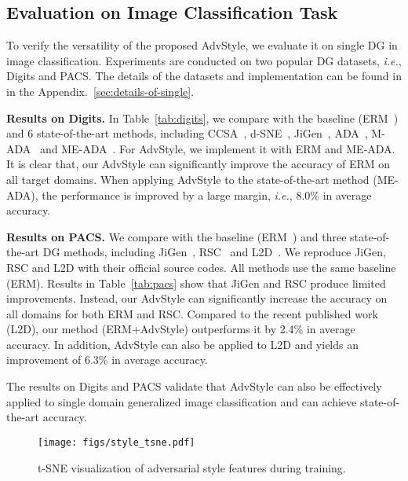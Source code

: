 \documentclass{article}
\def\ie{\emph{i.e.}} \def\Ie{\emph{I.e.}}
\newcommand{\ours}{AdvStyle\xspace}
\begin{document}
\subsection{Evaluation on Image Classification Task}


To verify the versatility of the proposed \ours, we evaluate it on single DG in image classification. Experiments are conducted on two popular DG datasets, \textit{i.e.}, Digits and PACS. The details of the datasets and implementation can be found in in the Appendix.~\ref{sec:details-of-single}.


\textbf{Results on Digits.} In Table~\ref{tab:digits}, we compare with the baseline (ERM~\cite{vapnik2013nature}) and 6 state-of-the-art methods, including CCSA~\cite{motiian2017unified}, d-SNE~\cite{xu2019d}, JiGen~\cite{carlucci2019domain}, ADA~\cite{volpi2018generalizing}, M-ADA~\cite{qiao2020learning} and ME-ADA~\cite{zhao2020maximum}. For \ours, we implement it with ERM and ME-ADA. It is clear that, our \ours can significantly improve the accuracy of ERM on all target domains. When applying \ours to the state-of-the-art method (ME-ADA), the performance is improved by a large margin, \ie, 8.0\% in average accuracy.


\textbf{Results on PACS.} We compare with the baseline (ERM~\cite{vapnik2013nature}) and three state-of-the-art DG methods, including JiGen~\cite{carlucci2019domain}, RSC~\cite{huangRSC2020} and L2D~\cite{wang2021L2D}. We reproduce JiGen, RSC and L2D with their official source codes. All methods use the same baseline (ERM). Results in Table~\ref{tab:pacs} show that JiGen and RSC produce limited improvements. Instead, our \ours can significantly increase the accuracy on all domains for both ERM and RSC.
Compared to the recent published work (L2D), our method (ERM+\ours) outperforms it by 2.4\% in average accuracy. 
In addition, \ours can also be applied to L2D and yields an improvement of 6.3\% in average accuracy.


The results on Digits and PACS validate that \ours can also be effectively applied to single domain generalized image classification and can achieve state-of-the-art accuracy.



\begin{figure*}[!t]
\centering
\texttt{[image: figs/style\_tsne.pdf]}
\caption{t-SNE visualization of adversarial style features during training.}
\label{fig:style_tsne}
\vspace{-.1in}
\end{figure*}
\end{document}
